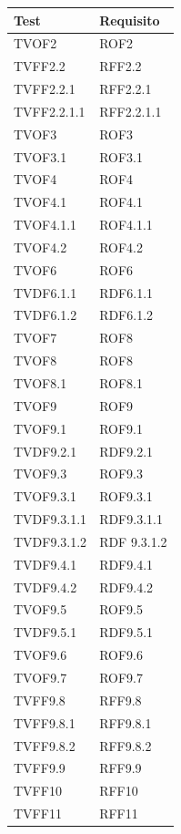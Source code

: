 \documentclass[openany,12pt,a4paper]{report}
\begin{document}
\begin{longtable}{| p{4cm} |p{4cm}|}
	\hline
	\textbf{Test} & \textbf{Requisito}\\
	\hline
	\endhead
	 TVOF2&ROF2
	\\[1em]	
	\hline	
	 TVFF2.2&RFF2.2
	\\[1em]	
	\hline
	 TVFF2.2.1&RFF2.2.1
	\\[1em]	
	\hline
	 TVFF2.2.1.1&RFF2.2.1.1
	\\[1em]	
	\hline
	 TVOF3&	ROF3
	\\[1em]	
	\hline	
	
	 TVOF3.1&ROF3.1
	\\[1em]		
	\hline
	 TVOF4&ROF4
	\\[1em]
	\hline
	 TVOF4.1&ROF4.1
	\\[1em]
	\hline	
	TVOF4.1.1&ROF4.1.1
	\\[1em]
	\hline
	TVOF4.2&ROF4.2
	\\[1em]
	\hline
	TVOF6&ROF6
	\\[1em]
	\hline
	 TVDF6.1.1&RDF6.1.1
	\\[1em]
	\hline	
	 TVDF6.1.2&RDF6.1.2
	\\[1em]
	\hline	
    TVOF7&ROF8
	\\[1em]	
	\hline
	 TVOF8&ROF8
	\\[1em]
	\hline
	 TVOF8.1&ROF8.1
	\\[1em]
	\hline
 	TVOF9&ROF9
	\\[1em]
	\hline
	 TVOF9.1& ROF9.1
	\\[1em]
	\hline
	 TVDF9.2.1& RDF9.2.1
	\\[1em]
	\hline
	 TVOF9.3&ROF9.3
	\\[1em]
	\hline
	 TVOF9.3.1& ROF9.3.1
	\\[1em]
	\hline
	 TVDF9.3.1.1& RDF9.3.1.1
	\\[1em]
	\hline
	 TVDF9.3.1.2& RDF 9.3.1.2
	\\[1em]
	\hline
	 TVDF9.4.1&RDF9.4.1
	\\[1em]
	\hline
	 TVDF9.4.2& RDF9.4.2
	\\[1em]
	\hline
	 TVOF9.5& ROF9.5
	\\[1em]
	\hline
	 TVDF9.5.1&RDF9.5.1
	\\[1em]
	\hline
	 TVOF9.6&ROF9.6
	\\[1em]
	\hline
	 TVOF9.7&ROF9.7
	\\[1em]
	\hline
	 TVFF9.8&RFF9.8
	\\[1em]
	\hline
	 TVFF9.8.1&RFF9.8.1
	\\[1em]
	\hline
	TVFF9.8.2&RFF9.8.2
	\\[1em]
	\hline
	TVFF9.9&RFF9.9
	\\[1em]
	\hline
	 TVFF10&RFF10
	\\[1em]
	\hline
	 TVFF11&RFF11
	\\[1em]
	\hline	
	

\end{longtable}
\end{document}
